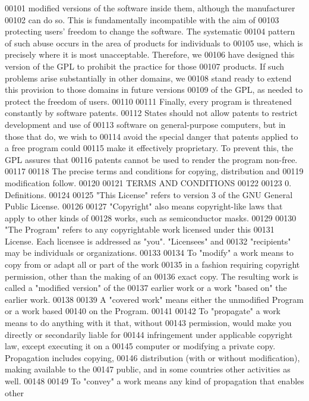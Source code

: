 \begin{DoxyCode}
00101 modified versions of the software inside them, although the manufacturer
00102 can do so.  This is fundamentally incompatible with the aim of
00103 protecting users' freedom to change the software.  The systematic
00104 pattern of such abuse occurs in the area of products for individuals to
00105 use, which is precisely where it is most unacceptable.  Therefore, we
00106 have designed this version of the GPL to prohibit the practice for those
00107 products.  If such problems arise substantially in other domains, we
00108 stand ready to extend this provision to those domains in future versions
00109 of the GPL, as needed to protect the freedom of users.
00110 
00111   Finally, every program is threatened constantly by software patents.
00112 States should not allow patents to restrict development and use of
00113 software on general-purpose computers, but in those that do, we wish to
00114 avoid the special danger that patents applied to a free program could
00115 make it effectively proprietary.  To prevent this, the GPL assures that
00116 patents cannot be used to render the program non-free.
00117 
00118   The precise terms and conditions for copying, distribution and
00119 modification follow.
00120 
00121                        TERMS AND CONDITIONS
00122 
00123   0. Definitions.
00124 
00125   "This License" refers to version 3 of the GNU General Public License.
00126 
00127   "Copyright" also means copyright-like laws that apply to other kinds of
00128 works, such as semiconductor masks.
00129 
00130   "The Program" refers to any copyrightable work licensed under this
00131 License.  Each licensee is addressed as "you".  "Licensees" and
00132 "recipients" may be individuals or organizations.
00133 
00134   To "modify" a work means to copy from or adapt all or part of the work
00135 in a fashion requiring copyright permission, other than the making of an
00136 exact copy.  The resulting work is called a "modified version" of the
00137 earlier work or a work "based on" the earlier work.
00138 
00139   A "covered work" means either the unmodified Program or a work based
00140 on the Program.
00141 
00142   To "propagate" a work means to do anything with it that, without
00143 permission, would make you directly or secondarily liable for
00144 infringement under applicable copyright law, except executing it on a
00145 computer or modifying a private copy.  Propagation includes copying,
00146 distribution (with or without modification), making available to the
00147 public, and in some countries other activities as well.
00148 
00149   To "convey" a work means any kind of propagation that enables other

\end{DoxyCode}
